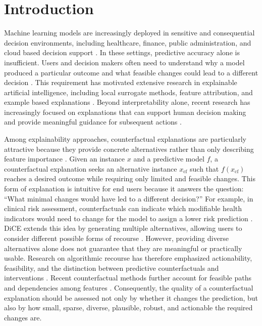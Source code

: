 \documentclass[preprint,12pt]{elsarticle}
\begin{document}

\section{Introduction}
\label{sec:introduction}

Machine learning models are increasingly deployed in sensitive and consequential
decision environments, including healthcare, finance, public administration, and cloud based decision support \cite{raza2025translime}. In these settings, predictive accuracy alone is insufficient. Users and decision makers often need to understand why a model produced a particular outcome and what feasible changes could lead to a different decision \cite{ding2022explainability}.
This requirement has motivated extensive research in explainable artificial
intelligence, including local surrogate methods, feature attribution, and
example based explanations
\cite{ribeiro2016why,lundberg2017unified,mothilal2020dice,saeed2023metasurvey}. Beyond interpretability alone, recent research has increasingly focused on explanations that can support human decision making and provide meaningful guidance for subsequent actions
\cite{kaplan2024usercentric,wijekoon2023discern}.

Among explainability approaches, counterfactual explanations are particularly attractive because they provide concrete alternatives rather than only describing feature importance \cite{karimi2022survey}. Given an instance $x$ and a predictive model $f$, a counterfactual explanation seeks an alternative instance $x_{\mathrm{cf}}$ such that $f(x_{\mathrm{cf}})$ reaches a desired outcome while requiring only limited and feasible changes. This form of
explanation is intuitive for end users because it answers the question:
``What minimal changes would have led to a different decision?'' For example,
in clinical risk assessment, counterfactuals can indicate which modifiable health indicators would need to change for the model to assign a lower risk
prediction \cite{lenatti2022novel}. DiCE extends this idea by generating multiple alternatives, allowing users to consider different possible forms of recourse \cite{mothilal2020dice}. However, providing diverse alternatives alone does not guarantee that they are meaningful or practically usable. Research on algorithmic recourse has therefore emphasized actionability, feasibility, and the distinction between predictive counterfactuals and interventions \cite{ustun2019recourse,karimi2021interventions,karimi2022survey}. Recent counterfactual methods further account for feasible paths and dependencies among features \cite{poyiadzi2020face,duong2024proce}. Consequently, the quality of a counterfactual explanation should be assessed not only by whether it changes the prediction, but also by how small, sparse, diverse, plausible, robust, and actionable the required changes are.
\end{document}

